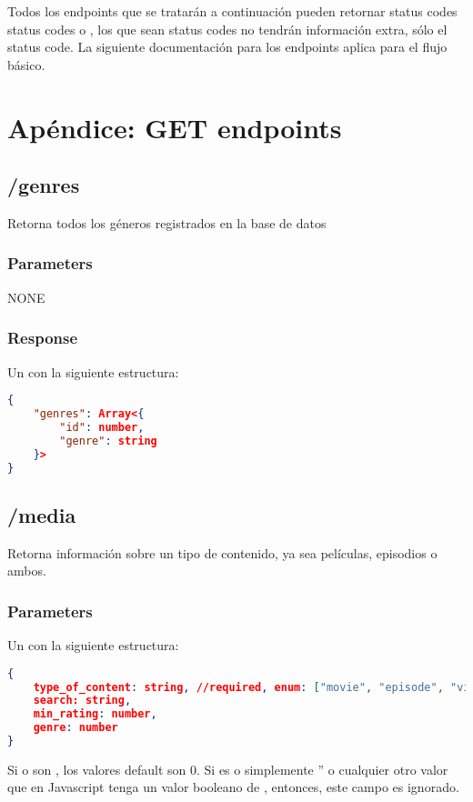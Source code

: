 \newpage
Todos los endpoints que se tratarán a continuación pueden retornar status codes status codes  o , los que sean  status codes no tendrán información extra, sólo el status code. La siguiente documentación para los endpoints aplica para el flujo básico.
	
\section{Apéndice: GET endpoints}	
\subsection{/genres}

Retorna todos los géneros registrados en la base de datos
	
\subsubsection{Parameters}
NONE
	
\subsubsection{Response}
Un  con la siguiente estructura:
	
\begin{lstlisting}[language=json]
{
	"genres": Array<{
		"id": number,
		"genre": string
	}>
}
\end{lstlisting}
	

\subsection{/media}
Retorna información sobre un tipo de contenido, ya sea películas, episodios o ambos.

\subsubsection{Parameters}
Un  con la siguiente estructura:

\begin{lstlisting}[language=json]
{
	type_of_content: string, //required, enum: ["movie", "episode", "video"]
	search: string,
	min_rating: number,
	genre: number
}
\end{lstlisting}


Si  o  son , los valores default son 0. Si  es  o simplemente '' o cualquier otro valor que en Javascript tenga un valor booleano de , entonces, este campo es ignorado.


